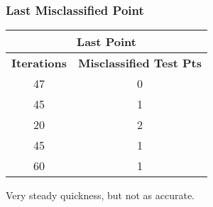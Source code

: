 \documentclass{article}
\begin{document}
\subsubsection*{Last Misclassified Point}
\begin{center}
\begin{tabular}{|c|c|}
	\hline
	\multicolumn{2}{|c|}{\textbf{Last Point}} \\\hline
	\textbf{Iterations} & \textbf{Misclassified Test Pts} \\\hline
	47 & 0 \\
	45 & 1\\
	20 & 2 \\
	45 & 1\\
	60 & 1\\
	\hline
\end{tabular}
\end{center}
Very steady quickness, but not as accurate.

\end{document}
